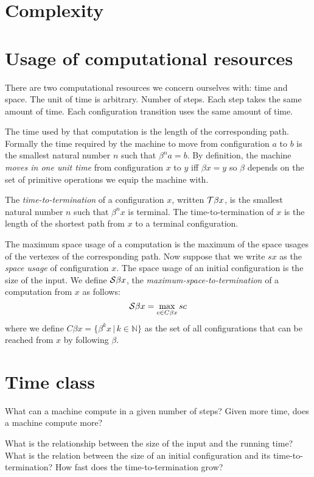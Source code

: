 \section{Complexity}

\section{Usage of computational resources}

There are two computational resources we concern ourselves with:
time and space.
The unit of time is arbitrary.
Number of steps. Each step takes the same amount of time.
Each configuration transition uses the same amount of time.

The time used by that computation is the length of the corresponding path.
Formally the time required by the machine
to move from configuration $a$ to $b$ is
the smallest natural number $n$ such that $\beta^n a = b$.
By definition, the machine \emph{moves in one unit time} from configuration $x$ to $y$ iff $\beta x = y$
so $\beta$ depends on the set of primitive operations we equip the machine with.

The \emph{time-to-termination} of a configuration $x$,
written $\mathcal{T} \beta x$,
is the smallest natural number $n$ such that $\beta^n x$ is terminal.
The time-to-termination of $x$ is the length of the shortest path from $x$ to a terminal configuration.

The maximum space usage of a computation is
the maximum of the space usages of the vertexes of the corresponding path.
Now suppose that we write $s x$ as the \emph{space usage} of configuration $x$.
The space usage of an initial configuration is the size of the input.
We define $\mathcal{S} \beta x$,
the \emph{maximum-space-to-termination} of a computation from $x$
as follows:
\begin{equation}
    \mathcal{S} \beta x = \max_{c \in C \beta x} s c
\end{equation}
where we define
$C \beta x = \{ \beta^k x \,|\, k \in \mathbb N \}$
as the set of all configurations
that can be reached from $x$ by following $\beta$.

\section{Time class}

What can a machine compute in a given number of steps?
Given more time, does a machine compute more?

What is the relationship between the size of the input and the running time?
What is the relation between the size of
an initial configuration and its time-to-termination?
How fast does the time-to-termination grow?


